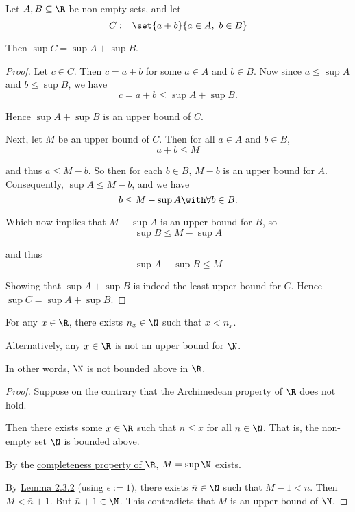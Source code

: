 \label{f426fd0}

Let $A,B\subseteq\R$ be non-empty sets, and let
$$
  C:=\set{a+b}{a\in A,\ b\in B}
$$

Then $\sup C=\sup A+\sup B$.

\begin{proof}
  Let $c\in C$. Then $c=a+b$ for some $a\in A$ and $b\in B$. Now since
  $a\leq\sup A$ and $b\leq\sup B$, we have
  $$
    c=a+b\leq\sup A+\sup B.
  $$

  Hence $\sup A+\sup B$ is an upper bound of $C$.

  Next, let $M$ be an upper bound of $C$. Then for all $a\in A$ and $b\in B$,
  $$
    a+b\leq M
  $$

  and thus $a\leq M-b$. So then for each $b\in B$, $M-b$ is an upper bound for
  $A$. Consequently, $\sup A\leq M-b$, and we have
  $$
    b\leq M-\sup A\with\forall b\in B.
  $$

  Which now implies that $M-\sup A$ is an upper bound for $B$, so
  $$
    \sup B\leq M-\sup A
  $$

  and thus
  $$
    \sup A+\sup B\leq M
  $$

  Showing that $\sup A+\sup B$ is indeed the least upper bound for $C$. Hence
  $\sup C=\sup A+\sup B$.
\end{proof}

\label{fbc2289}

For any $x\in\R$, there exists $n_x\in\N$ such that $x<n_x$.

Alternatively, any $x\in\R$ is not an upper bound for $\N$.

In other words, $\N$ is not bounded above in $\R$.

\begin{proof}
  Suppose on the contrary that the Archimedean property of $\R$ does not hold.

  Then there exists some $x\in\R$ such that $n\leq x$ for all $n\in\N$. That is,
  the non-empty set $\N$ is bounded above.

  By the \href{f330cf9}{completeness property of $\R$}, $M=\sup\N$ exists.

  By \href{f77f162}{Lemma 2.3.2} (using $\epsilon:=1$), there exists $\bar
  n\in\N$ such that $M-1<\bar n$. Then $M<\bar n+1$. But $\bar n+1\in\N$. This
  contradicts that $M$ is an upper bound of $\N$.
\end{proof}

\label{d845856}

